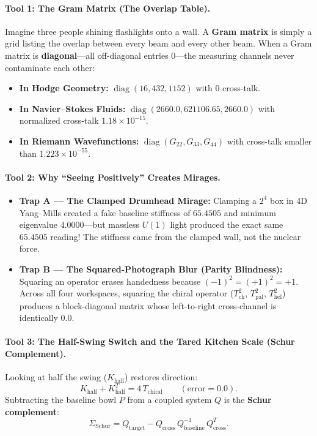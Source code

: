 \documentclass[11pt,a4paper]{article}
\begin{document}
\paragraph{Tool 1: The Gram Matrix (The Overlap Table).}
Imagine three people shining flashlights onto a wall. A \textbf{Gram matrix} is simply a grid listing the overlap between every beam and every other beam. When a Gram matrix is \textbf{diagonal}---all off-diagonal entries $0$---the measuring channels never contaminate each other:
\begin{itemize}
  \item \textbf{In Hodge Geometry:} $\operatorname{diag}(16, 432, 1152)$ with $0$ cross-talk.
  \item \textbf{In Navier--Stokes Fluids:} $\operatorname{diag}(2660.0, 621106.65, 2660.0)$ with normalized cross-talk $1.18\times 10^{-15}$.
  \item \textbf{In Riemann Wavefunctions:} $\operatorname{diag}(G_{22}, G_{33}, G_{44})$ with cross-talk smaller than $1.223\times 10^{-55}$.
\end{itemize}

\paragraph{Tool 2: Why ``Seeing Positively'' Creates Mirages.}
\begin{itemize}
  \item \textbf{Trap A --- The Clamped Drumhead Mirage:} Clamping a $2^4$ box in 4D Yang--Mills created a fake baseline stiffness of $65.4505$ and minimum eigenvalue $4.0000$---but massless $U(1)$ light produced the exact same $65.4505$ reading! The stiffness came from the clamped wall, not the nuclear force.
  \item \textbf{Trap B --- The Squared-Photograph Blur (Parity Blindness):} Squaring an operator erases handedness because $(-1)^2 = (+1)^2 = +1$. Across all four workspaces, squaring the chiral operator ($T_{\mathrm{ch}}^2$, $T_{\mathrm{pal}}^2$, $T_{\mathrm{hel}}^2$) produces a block-diagonal matrix whose left-to-right cross-channel is identically $0.0$.
\end{itemize}

\paragraph{Tool 3: The Half-Swing Switch and the Tared Kitchen Scale (Schur Complement).}
Looking at half the swing ($K_{\mathrm{half}}$) restores direction:
\[
  K_{\mathrm{half}} + K_{\mathrm{half}}^T = 4\,T_{\mathrm{chiral}} \qquad (\text{error} = 0.0).
\]
Subtracting the baseline bowl $P$ from a coupled system $Q$ is the \textbf{Schur complement}:
\[
  \Sigma_{\mathrm{Schur}} = Q_{\mathrm{target}} - Q_{\mathrm{cross}}\, Q_{\mathrm{baseline}}^{-1}\, Q_{\mathrm{cross}}^T.
\]
\end{document}
